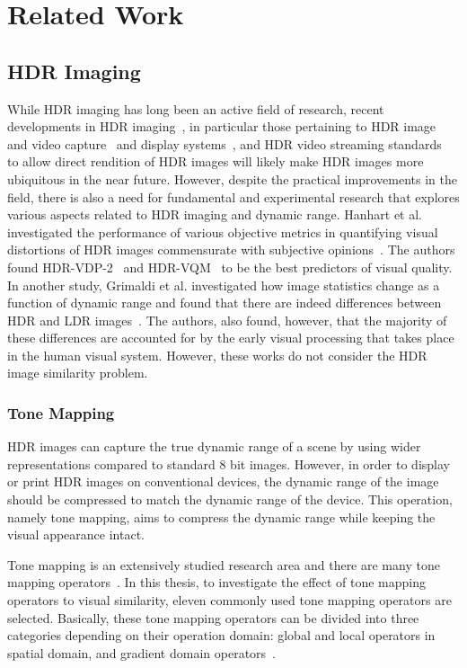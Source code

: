 \chapter{Related Work}
\label{chp:b2}

\section{HDR Imaging}

While HDR imaging has long been an active field of research, recent developments in HDR imaging~\cite{Rein2010,Banterle2011,chalmers2016high}, in particular those pertaining to HDR image and video capture~\cite{tocci2011versatile,froehlich2014creating} and display systems~\cite{seetzen2004high}, and HDR
video streaming standards~\cite{standard2016dynamic} to allow direct rendition of HDR images will likely make HDR images more ubiquitous in the near future. However, despite the practical improvements in the field, there is also a need for fundamental and experimental research that explores various aspects related to HDR imaging and dynamic range. Hanhart et al. investigated the performance of various objective metrics in quantifying visual distortions of HDR images commensurate with subjective opinions~\cite{hanhart2015benchmarking}. The authors found HDR-VDP-2~\cite{mantiuk2011hdr} and HDR-VQM~\cite{narwaria2015hdr} to be the best predictors of visual quality. In another study, Grimaldi et al. investigated how image statistics change as a function of dynamic range and found that there are indeed differences between HDR and LDR images~\cite{grimaldi2019statistics}. The authors, also found, however, that the majority of these differences are accounted for by the early visual processing that takes place in the human visual system. However, these works do not consider the HDR image similarity problem.


\subsection{Tone Mapping}
HDR images can capture the true dynamic range of a scene by using wider representations compared to standard 8 bit images. However, in order to display or print HDR images on conventional devices, the dynamic range of the image should be compressed to match the dynamic range of the device. This operation, namely tone mapping, aims to compress the dynamic range while keeping the visual appearance intact. 

Tone mapping is an extensively studied research area and there are many tone mapping operators~\cite{Rein2010}. In this thesis, to investigate the effect of tone mapping operators to visual similarity, eleven commonly used tone mapping operators are selected. Basically, these tone mapping operators can be divided into three categories depending on their operation domain: global and local operators in spatial domain, and gradient domain operators~\cite{Rein2010}. 

